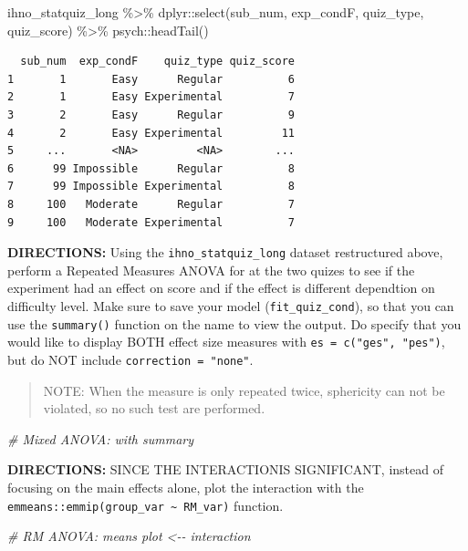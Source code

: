 \documentclass[
]{article}
\newenvironment{Shaded}{\begin{snugshade}}{\end{snugshade}}
\newcommand{\CommentTok}[1]{\textcolor[rgb]{0.56,0.35,0.01}{\textit{#1}}}
\newcommand{\FunctionTok}[1]{\textcolor[rgb]{0.00,0.00,0.00}{#1}}
\newcommand{\NormalTok}[1]{#1}
\newcommand{\SpecialCharTok}[1]{\textcolor[rgb]{0.00,0.00,0.00}{#1}}
\begin{document}
\begin{Shaded}
\begin{Highlighting}[]
\NormalTok{ihno\_statquiz\_long }\SpecialCharTok{\%\textgreater{}\%} 
\NormalTok{  dplyr}\SpecialCharTok{::}\FunctionTok{select}\NormalTok{(sub\_num, exp\_condF, quiz\_type, quiz\_score) }\SpecialCharTok{\%\textgreater{}\%} 
\NormalTok{  psych}\SpecialCharTok{::}\FunctionTok{headTail}\NormalTok{()}
\end{Highlighting}
\end{Shaded}

\begin{verbatim}
  sub_num  exp_condF    quiz_type quiz_score
1       1       Easy      Regular          6
2       1       Easy Experimental          7
3       2       Easy      Regular          9
4       2       Easy Experimental         11
5     ...       <NA>         <NA>        ...
6      99 Impossible      Regular          8
7      99 Impossible Experimental          8
8     100   Moderate      Regular          7
9     100   Moderate Experimental          7
\end{verbatim}

\textbf{DIRECTIONS:} Using the \texttt{ihno\_statquiz\_long} dataset
restructured above, perform a Repeated Measures ANOVA for at the two
quizes to see if the experiment had an effect on score and if the effect
is different dependtion on difficulty level. Make sure to save your
model (\texttt{fit\_quiz\_cond}), so that you can use the
\texttt{summary()} function on the name to view the output. Do specify
that you would like to display BOTH effect size measures with
\texttt{es\ =\ c("ges",\ "pes")}, but do NOT include
\texttt{correction\ =\ "none"}.

\begin{quote}
NOTE: When the measure is only repeated twice, sphericity can not be
violated, so no such test are performed.
\end{quote}

\begin{Shaded}
\begin{Highlighting}[]
\CommentTok{\# Mixed ANOVA:  with summary}
\end{Highlighting}
\end{Shaded}

\clearpage

\textbf{DIRECTIONS:} SINCE THE INTERACTIONIS SIGNIFICANT, instead of
focusing on the main effects alone, plot the interaction with the
\texttt{emmeans::emmip(group\_var\ \textasciitilde{}\ RM\_var)}
function.

\begin{Shaded}
\begin{Highlighting}[]
\CommentTok{\# RM ANOVA: means plot \textless{}{-}{-} interaction}
\end{Highlighting}
\end{Shaded}
\end{document}
